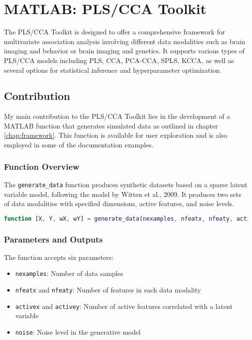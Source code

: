 \section{MATLAB: PLS/CCA Toolkit}

The PLS/CCA Toolkit is designed to offer a comprehensive framework for multivariate association analysis involving different data modalities such as brain imaging and behavior or brain imaging and genetics. It supports various types of PLS/CCA models including PLS, CCA, PCA-CCA, SPLS, KCCA, as well as several options for statistical inference and hyperparameter optimization.

\subsection{Contribution}

My main contribution to the PLS/CCA Toolkit lies in the development of a MATLAB function that generates simulated data as outlined in chapter \ref{chap:framework}. This function is available for user exploration and is also employed in some of the documentation examples.

\subsubsection{Function Overview}

The \texttt{generate\_data} function produces synthetic datasets based on a sparse latent variable model, following the model by Witten et al., 2009. It produces two sets of data modalities with specified dimensions, active features, and noise levels.

\begin{lstlisting}[language=Matlab]
function [X, Y, wX, wY] = generate_data(nexamples, nfeatx, nfeaty, activex, activey, noise)
\end{lstlisting}

\subsubsection{Parameters and Outputs}

The function accepts six parameters:

\begin{itemize}
    \item \texttt{nexamples}: Number of data samples
    \item \texttt{nfeatx} and \texttt{nfeaty}: Number of features in each data modality
    \item \texttt{activex} and \texttt{activey}: Number of active features correlated with a latent variable
    \item \texttt{noise}: Noise level in the generative model
\end{itemize}

